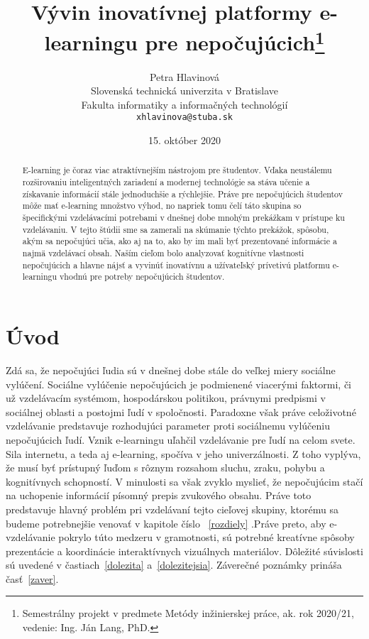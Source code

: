 \documentclass[10pt,twoside,slovak,a4paper]{article}
\title{Vývin inovatívnej platformy e-learningu pre nepočujúcich\thanks{Semestrálny projekt v predmete Metódy inžinierskej práce, ak. rok 2020/21, vedenie: Ing. Ján Lang, PhD.}} %
\author{Petra Hlavinová\\[2pt]
	{\small Slovenská technická univerzita v Bratislave}\\
	{\small Fakulta informatiky a informačných technológií}\\
	{\small \texttt{xhlavinova@stuba.sk}}
	}
\date{\small 15. október 2020} %
\begin{document}
\maketitle

\begin{abstract}
E-learning je čoraz viac atraktívnejším nástrojom pre študentov. Vďaka neustálemu rozširovaniu inteligentných zariadení a modernej technológie sa stáva učenie a získavanie informácií stále jednoduchšie a rýchlejšie. Práve pre nepočujúcich študentov môže mať e-learning množstvo výhod, no napriek tomu čelí táto skupina so špecifickými vzdelávacími potrebami v dnešnej dobe mnohým prekážkam v prístupe ku vzdelávaniu. V tejto štúdii sme sa zamerali na skúmanie týchto prekážok, spôsobu, akým sa nepočujúci učia, ako aj na to, ako by im mali byť prezentované informácie a najmä vzdelávací obsah. Naším cieľom bolo analyzovať kognitívne vlastnosti nepočujúcich a hlavne nájsť a vyvinúť inovatívnu a užívateľský prívetivú platformu e-learningu vhodnú pre potreby nepočujúcich študentov. 
\end{abstract}



\section{Úvod}

Zdá sa, že nepočujúci ľudia sú v dnešnej dobe stále do veľkej miery sociálne vylúčení. Sociálne vylúčenie nepočujúcich je podmienené viacerými faktormi, či už vzdelávacím systémom, hospodárskou politikou, právnymi predpismi v sociálnej oblasti a postojmi ľudí v spoločnosti. Paradoxne však práve celoživotné vzdelávanie predstavuje rozhodujúci parameter proti sociálnemu vylúčeniu nepočujúcich ľudí. Vznik e-learningu uľahčil vzdelávanie pre ľudí na celom svete. Sila internetu, a teda aj e-learning, spočíva v jeho univerzálnosti. Z toho vyplýva, že musí byť prístupný ľuďom s rôznym rozsahom sluchu, zraku, pohybu a kognitívnych schopností.  V minulosti sa však zvyklo myslieť, že nepočujúcim stačí na uchopenie informácií písomný prepis zvukového obsahu. Práve toto predstavuje hlavný problém pri vzdelávaní tejto cieľovej skupiny, ktorému sa budeme potrebnejšie venovať v kapitole číslo ~\ref{rozdiely} .Práve preto, aby e-vzdelávanie pokrylo túto medzeru v gramotnosti, sú potrebné kreatívne spôsoby prezentácie a koordinácie interaktívnych vizuálnych materiálov.
Dôležité súvislosti sú uvedené v častiach~\ref{dolezita} a~\ref{dolezitejsia}.
Záverečné poznámky prináša časť~\ref{zaver}.
\end{document}
